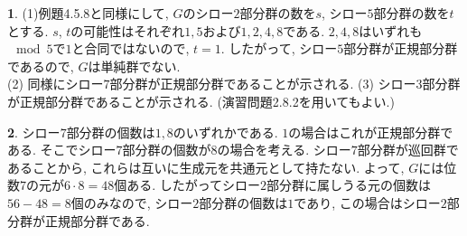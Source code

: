 \documentclass{article}
\theoremstyle{definition}
\newtheorem{ans}{}
\numberwithin{ans}{subsection}
\begin{document}
\begin{ans}
  (1)例題4.5.8と同様にして,
  $G$のシロー$2$部分群の数を$s$, シロー$5$部分群の数を$t$とする.
  $s$, $t$の可能性はそれぞれ$1, 5$および$1, 2, 4, 8$である.
  $2, 4, 8$はいずれも$\mod 5$で$1$と合同ではないので, $t = 1$.
  したがって, シロー$5$部分群が正規部分群であるので, $G$は単純群でない.\\
  (2) 同様にシロー$7$部分群が正規部分群であることが示される.
  (3) シロー$3$部分群が正規部分群であることが示される. (演習問題2.8.2を用いてもよい.)
\end{ans}

\begin{ans}
  シロー$7$部分群の個数は$1, 8$のいずれかである. $1$の場合はこれが正規部分群である.
  そこでシロー$7$部分群の個数が$8$の場合を考える.
  シロー$7$部分群が巡回群であることから, これらは互いに生成元を共通元として持たない.
  よって, $G$には位数$7$の元が$6 \cdot 8 = 48$個ある.
  したがってシロー$2$部分群に属しうる元の個数は$56 - 48 = 8$個のみなので, シロー$2$部分群の個数は$1$であり,
  この場合はシロー$2$部分群が正規部分群である.
\end{ans}
\end{document}
